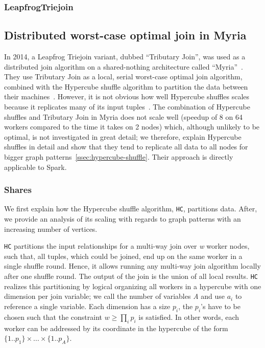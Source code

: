 \subsubsection{LeapfrogTriejoin}

\subsection{Distributed worst-case optimal join in Myria}
In 2014, a Leapfrog Triejoin variant, dubbed ``Tributary Join'', was used as a distributed join algorithm on a shared-nothing architecture called ``Myria''~\cite{myria-detailed}.
They use Tributary Join as a local, serial worst-case optimal join algorithm, combined with the Hypercube shuffle algorithm to partition the data between their machines~\cite{hypercube}.
However, it is not obvious how well Hypercube shuffles scales because it replicates many of its input tuples~\cite{myria-detailed}.
The combination of Hypercube shuffles and Tributary Join in Myria does not scale well (speedup of 8 on 64 workers compared to the time it takes on 2 nodes) which, although unlikely to be optimal, is not investigated in great detail; we therefore, explain Hypercube shuffles in detail and show that they tend to replicate all data to all nodes for bigger graph patterns~\cref{ssec:hypercube-shuffle}.
Their approach is directly applicable to Spark.

\subsubsection{Shares}
We first explain how the Hypercube shuffle algorithm, \texttt{HC}, partitions data.
After, we provide an analysis of its scaling with regards to graph patterns with an increasing number of vertices.

\texttt{HC} partitions the input relationships for a multi-way join over \textit{w} worker nodes, such that, all tuples, which could be joined, end up on the same worker in a single shuffle round.
Hence, it allows running any multi-way join algorithm locally after one shuffle round.
The output of the join is the union of all local results.
\texttt{HC} realizes this partitioning by logical organizing all workers in a hypercube with one dimension per join variable; we call the number of variables \textit{A} and use $a_i$ to reference a single variable.
Each dimension has a size $p_i$, the $p_i$'s have to be chosen such that the constraint $w \ge \prod_{i}p_i$ is satisfied.  %
In other words, each worker can be addressed by its coordinate in the hypercube of the form $\{1..p_1\} \times ... \times \{1..p_A\}$.

